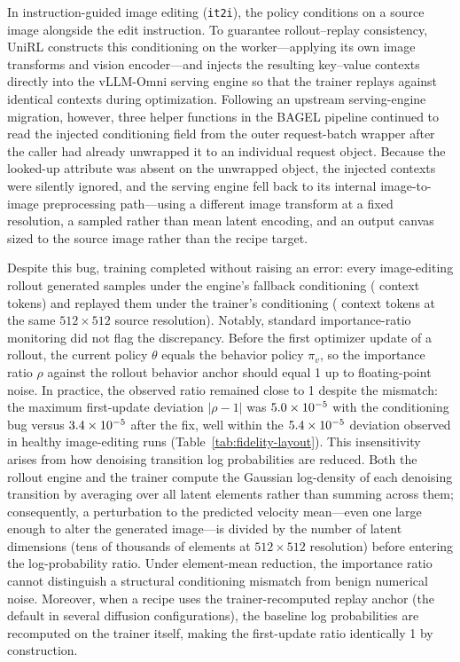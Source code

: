 In instruction-guided image editing (\texttt{it2i}), the policy conditions on a source image alongside the edit instruction.
To guarantee rollout--replay consistency, UniRL constructs this conditioning on the worker---applying its own image transforms and vision encoder---and injects the resulting key--value contexts directly into the vLLM-Omni serving engine so that the trainer replays against identical contexts during optimization.
Following an upstream serving-engine migration, however, three helper functions in the BAGEL pipeline continued to read the injected conditioning field from the outer request-batch wrapper after the caller had already unwrapped it to an individual request object.
Because the looked-up attribute was absent on the unwrapped object, the injected contexts were silently ignored, and the serving engine fell back to its internal image-to-image preprocessing path---using a different image transform at a fixed resolution, a sampled rather than mean latent encoding, and an output canvas sized to the source image rather than the recipe target.

Despite this bug, training completed without raising an error: every image-editing rollout generated samples under the engine's fallback conditioning (\RFWorkerKv{} context tokens) and replayed them under the trainer's conditioning (\RFTrainerKv{} context tokens at the same $512\times512$ source resolution).
Notably, standard importance-ratio monitoring did not flag the discrepancy.
Before the first optimizer update of a rollout, the current policy $\theta$ equals the behavior policy $\pi_v$, so the importance ratio $\rho$ against the rollout behavior anchor should equal 1 up to floating-point noise.
In practice, the observed ratio remained close to 1 despite the mismatch: the maximum first-update deviation $|\rho - 1|$ was $5.0\times10^{-5}$ with the conditioning bug versus $3.4\times10^{-5}$ after the fix, well within the $5.4\times10^{-5}$ deviation observed in healthy image-editing runs (Table~\ref{tab:fidelity-layout}).
This insensitivity arises from how denoising transition log probabilities are reduced.
Both the rollout engine and the trainer compute the Gaussian log-density of each denoising transition by averaging over all latent elements rather than summing across them; consequently, a perturbation to the predicted velocity mean---even one large enough to alter the generated image---is divided by the number of latent dimensions (tens of thousands of elements at $512\times512$ resolution) before entering the log-probability ratio.
Under element-mean reduction, the importance ratio cannot distinguish a structural conditioning mismatch from benign numerical noise.
Moreover, when a recipe uses the trainer-recomputed replay anchor (the default in several diffusion configurations), the baseline log probabilities are recomputed on the trainer itself, making the first-update ratio identically 1 by construction.

